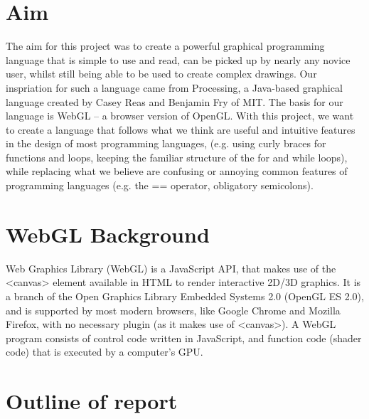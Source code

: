 \documentclass{l3proj}
\begin{document}
\section{Aim}

The aim for this project was to create a powerful graphical programming language that is simple to use and read, can be picked up by nearly any novice user, whilst still being able to be used to create complex drawings. Our inspriation for such a language came from Processing, a Java-based graphical language created by Casey Reas and Benjamin Fry of MIT. The basis for our language is WebGL – a browser version of OpenGL. With this project, we want to create a language that follows what we think are useful and intuitive features in the design of most programming languages, (e.g. using curly braces for functions and loops, keeping the familiar structure of the for and while loops), while replacing what we believe are confusing or annoying common features of programming languages (e.g. the == operator, obligatory semicolons).

\section{WebGL Background}

Web Graphics Library (WebGL) is a JavaScript API, that makes use of the \textless{}canvas\textgreater{} element available in HTML to render interactive 2D/3D graphics. It is a branch of the Open Graphics Library Embedded Systems 2.0 (OpenGL ES 2.0), and is supported by most modern browsers, like Google Chrome and Mozilla Firefox, with no necessary plugin (as it makes use of \textless{}canvas\textgreater{}). A WebGL program consists of control code written in JavaScript, and function code (shader code) that is executed by a computer's GPU. 

\section{Outline of report}
\end{document}
